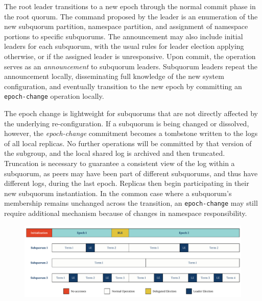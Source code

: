 The root leader transitions to a new epoch through the normal commit phase in the root quorum.
The command proposed by the leader is an enumeration of the new subquorum partition, namespace partition, and assignment of namespace portions to specific subquorums.
The announcement may also include initial leaders for each subquorum, with the usual rules for leader election applying otherwise, or if the assigned leader is unresponsive.
Upon commit, the operation serves as an \emph{announcement} to subquorum leaders.
Subquorum leaders repeat the announcement locally, disseminating full knowledge of the new system configuration, and eventually transition to the new epoch by committing an \texttt{epoch-change} operation locally.

The epoch change is lightweight for subquorums that are not directly affected by the underlying re-configuration.
If a subquorum is being changed or dissolved, however, the \emph{epoch-change} commitment becomes a tombstone written to the logs of all local replicas.
No further operations will be committed by that version of the subgroup, and the local shared log is archived and then truncated.
Truncation is necessary to guarantee a consistent view of the log within a subquorum, as peers may have been part of different subquorums, and thus have different logs, during the last epoch.
Replicas then begin participating in their new subquorum instantiation.
In the common case where a subquorum's membership remains unchanged across the transition, an \texttt{epoch-change} may still require additional mechanism because of changes in namespace responsibility.

\begin{landscape}
\begin{figure}
    \begin{center}
        \includegraphics[width=8.2in]{figures/ch03_epochs_terms.pdf}
    \end{center}
    \renewcommand{\baselinestretch}{1}
    \small\normalsize

    \begin{quote}
        \caption[Ordering of Epochs and Terms in Root and Subquorums]{}
        \label{fig:ch03_epochs_terms}
    \end{quote}
\end{figure}
\renewcommand{\baselinestretch}{2}
\small\normalsize
\end{landscape}


